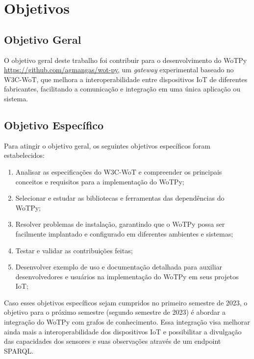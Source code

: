 \chapter{Objetivos}

\section{Objetivo Geral}


O objetivo geral deste trabalho foi contribuir para o desenvolvimento do WoTPy \url{https://github.com/agmangas/wot-py}, um \textit{gateway} experimental baseado no W3C-WoT, que melhora a interoperabilidade entre dispositivos IoT de diferentes fabricantes, facilitando a comunicação e integração em uma única aplicação ou sistema.

\section{Objetivo Específico}


Para atingir o objetivo geral, os seguintes objetivos específicos foram estabelecidos:

\begin{enumerate}
    \item Analisar as especificações do W3C-WoT \cite{WoTArchitecture} e compreender os principais conceitos e requisitos para a implementação do WoTPy;
    \item Selecionar e estudar as bibliotecas e ferramentas das dependências do WoTPy;
    \item Resolver problemas de instalação, garantindo que o WoTPy possa ser facilmente implantado e configurado em diferentes ambientes e sistemas;
    \item Testar e validar as contribuições feitas;
    \item Desenvolver exemplo de uso e documentação detalhada para auxiliar desenvolvedores e usuários na implementação do WoTPy em seus projetos IoT;
\end{enumerate}

Caso esses objetivos específicos sejam cumpridos no primeiro semestre de 2023, o objetivo para o próximo semestre (segundo semestre de 2023) é abordar a integração do WoTPy com grafos de conhecimento. Essa integração visa melhorar ainda mais a interoperabilidade dos dispositivos IoT e possibilitar a divulgação das capacidades dos sensores e suas observações através de um endpoint SPARQL.
